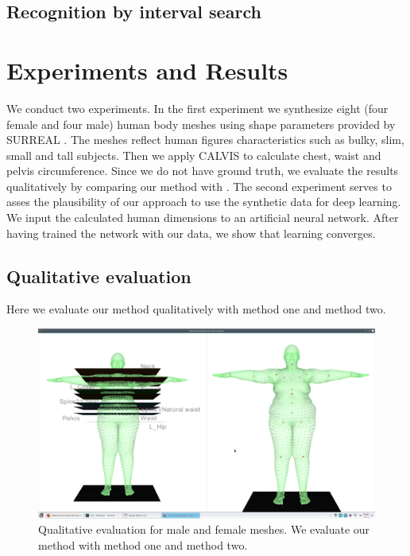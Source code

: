 \documentclass[runningheads, orivec]{llncs}
\begin{document}
\subsection{Recognition by interval search}\label{subsec:interval_search}

\section{Experiments and Results}

We conduct two experiments. In the first experiment we synthesize eight (four 
female and four male) human body meshes using shape parameters provided by 
SURREAL \cite{varol17_surreal}.
The meshes reflect human figures characteristics such as bulky, slim, small and 
tall subjects. Then we apply CALVIS to calculate chest, waist and pelvis 
circumference. Since we do not have ground truth, we evaluate the results 
qualitatively by comparing our method 
with \cite{Dibra.2016b}.
The second 
experiment serves to asses the plausibility of our approach to use the 
synthetic data for deep learning. We input the calculated human 
dimensions to an artificial neural network. After having trained the network 
with our data, we show that learning converges.

\subsection{Qualitative evaluation}\label{subsec:qualitative_eval}
Here we evaluate our method qualitatively with method one and method two.
\begin{figure}[H]
	\begin{center}
		\includegraphics[width=\linewidth]{subject_6_with_cutting_planes_on_joints.eps}
	\end{center}
	\caption{Qualitative evaluation for male and female meshes. We evaluate our 
	method with method one and method two.}
	\label{fig:qualitative_eval}
\end{figure}
\end{document}
